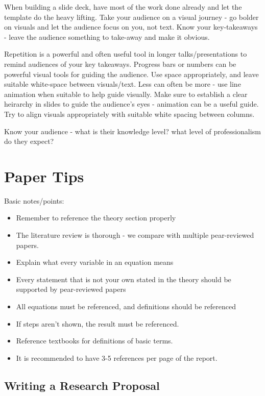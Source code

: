 \documentclass[12pt, a4paper, oneside, openright, titlepage]{book}
\begin{document}
\begin{appendices}
    When building a slide deck, have most of the work done already and let the template do the heavy lifting. Take your audience on a visual journey - go bolder on visuals and let the audience focus on you, not text. Know your key-takeaways - leave the audience something to take-away and make it obvious.

    Repetition is a powerful and often useful tool in longer talks/presentations to remind audiences of your key takeaways. Progress bars or numbers can be powerful visual tools for guiding the audience. Use space appropriately, and leave suitable white-space between visuals/text. Less can often be more - use line animation when suitable to help guide visually. Make sure to establish a clear heirarchy in slides to guide the audience's eyes - animation can be a useful guide. Try to align visuals appropriately with suitable white spacing between columns.

    Know your audience - what is their knowledge level? what level of professionalism do they expect?

    
    \section{Paper Tips}

    Basic notes/points: \begin{itemize}
        \item Remember to reference the theory section properly
        \item The literature review is thorough - we compare with multiple pear-reviewed papers.
        \item Explain what every variable in an equation means
        \item Every statement that is not your own stated in the theory should be supported by pear-reviewed papers
        \item All equations must be referenced, and definitions should be referenced
        \item If steps aren't shown, the result must be referenced. 
        \item Reference textbooks for definitions of basic terms.
        \item It is recommended to have 3-5 references per page of the report.
    \end{itemize}


    \subsection{Writing a Research Proposal}


\end{appendices}
\end{document}

